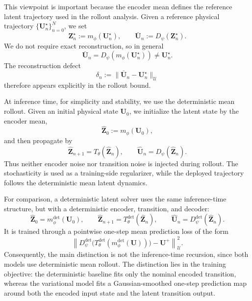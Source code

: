 \documentclass[11pt]{article}
\begin{document}
This viewpoint is important because the encoder mean defines the reference latent trajectory used
in the rollout analysis. Given a reference physical trajectory
$\{\mathbf U_n^\star\}_{n=0}^N$, we set
\[
    \mathbf Z_n^\star := m_\phi(\mathbf U_n^\star),
    \qquad
    \bar{\mathbf U}_n := D_\psi(\mathbf Z_n^\star).
\]
We do not require exact reconstruction, so in general
\[
    \bar{\mathbf U}_n
    =
    D_\psi(m_\phi(\mathbf U_n^\star))
    \neq
    \mathbf U_n^\star .
\]
The reconstruction defect
\[
    \delta_n
    :=
    \|\bar{\mathbf U}_n-\mathbf U_n^\star\|_{\mathcal U}
\]
therefore appears explicitly in the rollout bound.

At inference time, for simplicity and stability, we use the deterministic mean rollout. Given an
initial physical state $\mathbf U_0$, we initialize the latent state by the encoder mean,
\[
    \widehat{\mathbf Z}_0 := m_\phi(\mathbf U_0),
\]
and then propagate by
\[
    \widehat{\mathbf Z}_{n+1}
    =
    T_\theta(\widehat{\mathbf Z}_n),
    \qquad
    \widehat{\mathbf U}_n
    =
    D_\psi(\widehat{\mathbf Z}_n).
\]
Thus neither encoder noise nor transition noise is injected during rollout. The stochasticity is used
as a training-side regularizer, while the deployed trajectory follows the deterministic mean latent
dynamics.

For comparison, a deterministic latent solver uses the same inference-time structure, but with a
deterministic encoder, transition, and decoder:
\[
    \widehat{\mathbf Z}_0
    =
    m_\phi^{\mathrm{det}}(\mathbf U_0),
    \qquad
    \widehat{\mathbf Z}_{n+1}
    =
    T_\theta^{\mathrm{det}}(\widehat{\mathbf Z}_n),
    \qquad
    \widehat{\mathbf U}_n
    =
    D_\psi^{\mathrm{det}}(\widehat{\mathbf Z}_n).
\]
It is trained through a pointwise one-step mean prediction loss of the form
\[
    \left\|
    D_\psi^{\mathrm{det}}
    \big(
    T_\theta^{\mathrm{det}}(m_\phi^{\mathrm{det}}(\mathbf U))
    \big)
    -
    \mathbf U^+
    \right\|_{\mathcal U}^2 .
\]
Consequently, the main distinction is not the inference-time recursion, since both models use deterministic mean rollout. The distinction lies in the training objective: the deterministic baseline fits only the nominal encoded transition, whereas the variational model fits a Gaussian-smoothed one-step prediction map around both the encoded input state and the latent transition output.
\end{document}
